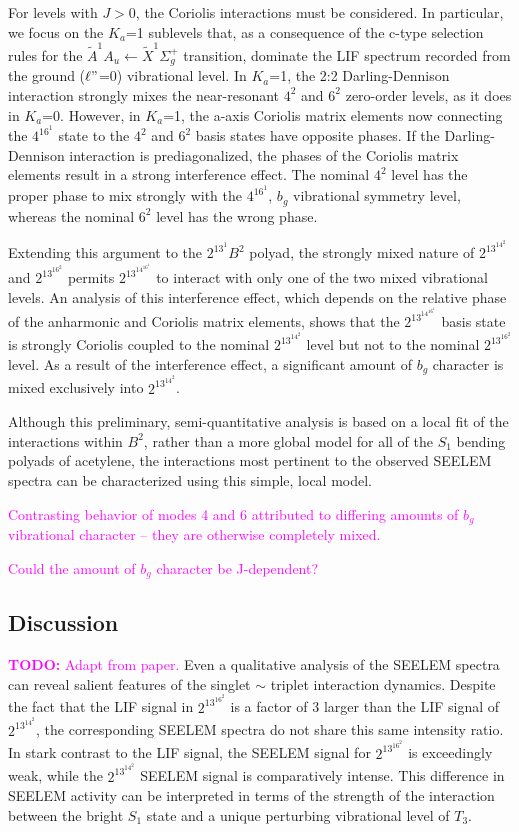\documentclass[12pt,draft]{mitthesis}
\newcommand{\TODO} [1]{\textcolor{magenta}{\textbf{TODO:} #1}}
\newcommand{\POINT}[1]{\textcolor{magenta}{#1}}
\begin{document}
For levels with $J>0$, the Coriolis interactions must be
considered. In particular, we focus on the $K_a$=1 sublevels that, as
a consequence of the c-type selection rules for the $\tilde{A}^1A_u
\leftarrow \tilde{X} ^1\Sigma_g^+$ transition, dominate the LIF
spectrum recorded from the ground ($\ell"$=0) vibrational level. In
$K_a$=1, the 2:2 Darling-Dennison interaction strongly mixes the
near-resonant $4^2$ and $6^2$ zero-order levels, as it does in
$K_a$=0. However, in $K_a$=1, the a-axis Coriolis matrix elements now
connecting the $4^16^1$ state to the $4^2$ and $6^2$ basis states have
opposite phases. If the Darling-Dennison interaction is
prediagonalized, the phases of the Coriolis matrix elements result in
a strong interference effect. The nominal $4^2$ level has the proper
phase to mix strongly with the $4^16^1$, $b_g$ vibrational symmetry
level, whereas the nominal $6^2$ level has the wrong phase.

Extending this argument to the $2^13^1B^2$ polyad, the strongly mixed
nature of $2^13^14^2$ and $2^13^16^2$ permits $2^13^14^16^1$ to
interact with only one of the two mixed vibrational levels. An
analysis of this interference effect, which depends on the relative
phase of the anharmonic and Coriolis matrix elements, shows that the
 $2^13^14^16^1$ basis state is strongly Coriolis coupled to the nominal
$2^13^14^2$ level but not to the nominal $2^13^16^2$ level. As a result
of the interference effect, a significant amount of $b_g$ character is
mixed exclusively into $2^13^14^2$.

Although this preliminary, semi-quantitative analysis is based on a
local fit of the interactions within $B^2$, rather than a more global
model for all of the $S_1$ bending polyads of acetylene, the interactions
most pertinent to the observed SEELEM spectra can be characterized
using this simple, local model.

\POINT{Contrasting behavior of modes 4 and 6 attributed to differing
  amounts of $b_g$ vibrational character -- they are otherwise
  completely mixed.}

\POINT{Could the amount of $b_g$ character be J-dependent?}

\subsection{Discussion}

\TODO{Adapt from paper.}  Even a qualitative analysis of the SEELEM
spectra can reveal salient features of the singlet $\sim$ triplet
interaction dynamics. Despite the fact that the LIF signal in
$2^13^16^2$ is a factor of 3 larger than the LIF signal of
$2^13^14^2$, the corresponding SEELEM spectra do not share this same
intensity ratio. In stark contrast to the LIF signal, the SEELEM
signal for $2^13^16^2$ is exceedingly weak, while the $2^13^14^2$
SEELEM signal is comparatively intense. This difference in SEELEM
activity can be interpreted in terms of the strength of the
interaction between the bright $S_1$ state and a unique perturbing
vibrational level of $T_3$.
\end{document}

